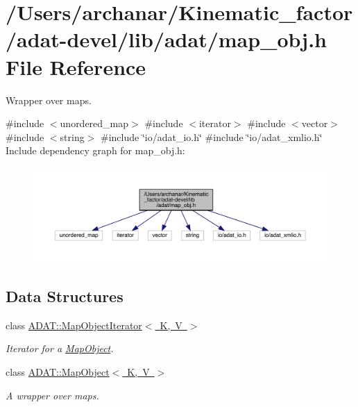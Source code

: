 \hypertarget{adat-devel_2lib_2adat_2map__obj_8h}{}\section{/\+Users/archanar/\+Kinematic\+\_\+factor/adat-\/devel/lib/adat/map\+\_\+obj.h File Reference}
\label{adat-devel_2lib_2adat_2map__obj_8h}


Wrapper over maps.  


{\ttfamily \#include $<$unordered\+\_\+map$>$}\newline
{\ttfamily \#include $<$iterator$>$}\newline
{\ttfamily \#include $<$vector$>$}\newline
{\ttfamily \#include $<$string$>$}\newline
{\ttfamily \#include \char`\"{}io/adat\+\_\+io.\+h\char`\"{}}\newline
{\ttfamily \#include \char`\"{}io/adat\+\_\+xmlio.\+h\char`\"{}}\newline
Include dependency graph for map\+\_\+obj.\+h\+:
\nopagebreak
\begin{figure}[H]
\begin{center}
\leavevmode
\includegraphics[width=350pt]{da/de7/adat-devel_2lib_2adat_2map__obj_8h__incl}
\end{center}
\end{figure}
\subsection*{Data Structures}
\begin{DoxyCompactItemize}
\item 
class \mbox{\hyperlink{classADAT_1_1MapObjectIterator}{A\+D\+A\+T\+::\+Map\+Object\+Iterator$<$ K, V $>$}}
\begin{DoxyCompactList}\small\item\em Iterator for a \mbox{\hyperlink{classADAT_1_1MapObject}{Map\+Object}}. \end{DoxyCompactList}\item 
class \mbox{\hyperlink{classADAT_1_1MapObject}{A\+D\+A\+T\+::\+Map\+Object$<$ K, V $>$}}
\begin{DoxyCompactList}\small\item\em A wrapper over maps. \end{DoxyCompactList}\end{DoxyCompactItemize}
